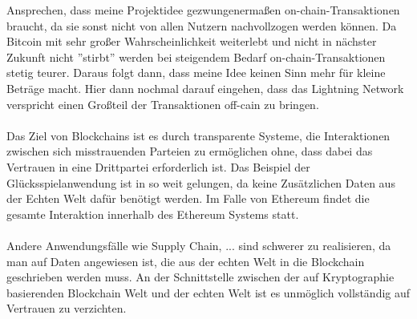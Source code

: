 Ansprechen, dass meine Projektidee gezwungenermaßen on-chain-Transaktionen braucht, da sie sonst nicht von allen Nutzern nachvollzogen werden können. Da Bitcoin mit sehr großer Wahrscheinlichkeit weiterlebt und nicht in nächster Zukunft nicht ''stirbt'' werden bei steigendem Bedarf on-chain-Transaktionen stetig teurer. Daraus folgt dann, dass meine Idee keinen Sinn mehr für kleine Beträge macht. Hier dann nochmal darauf eingehen, dass das Lightning Network verspricht einen Großteil der Transaktionen off-cain zu bringen.\\\\

Das Ziel von Blockchains ist es durch transparente Systeme, die Interaktionen zwischen sich misstrauenden Parteien zu ermöglichen ohne, dass dabei das Vertrauen in eine Drittpartei erforderlich ist.
Das Beispiel der Glücksspielanwendung ist in so weit gelungen, da keine Zusätzlichen Daten aus der Echten Welt dafür benötigt werden. Im Falle von Ethereum findet die gesamte Interaktion innerhalb des Ethereum Systems statt.\\\\

Andere Anwendungsfälle wie Supply Chain, ... sind schwerer zu realisieren, da man auf Daten angewiesen ist, die aus der echten Welt in die Blockchain geschrieben werden muss. An der Schnittstelle zwischen der auf Kryptographie basierenden Blockchain Welt und der echten Welt ist es unmöglich vollständig auf Vertrauen zu verzichten.

